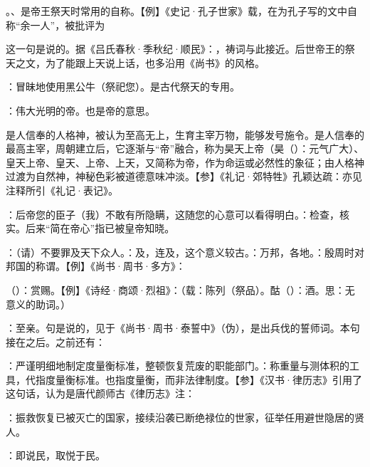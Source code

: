 {\begin{lyitemize}
\item {}。、是帝王祭天时常用的自称。【例】《史记·孔子世家》载，在为孔子写的文中自称“余一人”，被批评为

这一句是说的。据《吕氏春秋·季秋纪·顺民》：，祷词与此接近。后世帝王的祭天之文，为了能跟上天说上话，也多沿用《尚书》的风格。

\item {}：冒昧地使用黑公牛（祭祀您）。是古代祭天的专用。
\item {}：伟大光明的帝。也是帝的意思。

是人信奉的人格神，被认为至高无上，生育主宰万物，能够发号施令。是人信奉的最高主宰，周朝建立后，它逐渐与“帝”融合，称为昊天上帝（昊（）：元气广大）、皇天上帝、皇天、上帝、上天，又简称为帝，作为命运或必然性的象征；由人格神过渡为自然神，神秘色彩被道德意味冲淡。【参】《礼记·郊特牲》孔颖达疏：亦见  注释所引《礼记·表记》。

\item {}：后帝您的臣子（我）不敢有所隐瞒，这随您的心意可以看得明白。：检查，核实。后来“简在帝心”指已被皇帝知晓。
\item {}：（请）不要罪及天下众人。：及，连及，这个意义较古。：万邦，各地。：殷周时对邦国的称谓。【例】《尚书·周书·多方》：
\item {}（）：赏赐。【例】《诗经·商颂·烈祖》：（载：陈列（祭品）。酤（）：酒。思：无意义的助词。）
\item {}：至亲。句是说的，见于《尚书·周书·泰誓中》（伪），是出兵伐的誓师词。本句接在之后。之前还有：

\item {}：严谨明细地制定度量衡标准，整顿恢复荒废的职能部门。：称重量与测体积的工具，代指度量衡标准。也指度量衡，而非法律制度。【参】《汉书·律历志》引用了这句话，认为是唐代颜师古《律历志》注：

\item {}：振救恢复已被灭亡的国家，接续沿袭已断绝禄位的世家，征举任用避世隐居的贤人。%
\item {}：即说民，取悦于民。
\end{lyitemize}
}
{}


